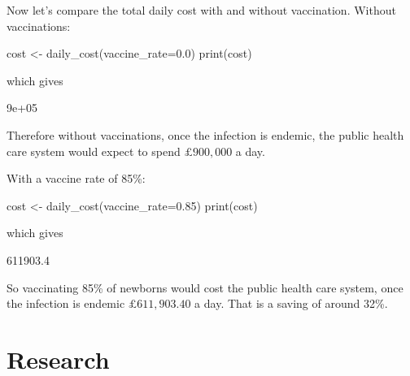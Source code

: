 Now let's compare the total daily cost with and without vaccination. Without
vaccinations:

\begin{Rin}
cost <- daily_cost(vaccine_rate=0.0)
print(cost)
\end{Rin}

which gives

\begin{Rout}
[1] 9e+05
\end{Rout}

Therefore without vaccinations, once the infection is endemic, the public health
care system would expect to spend $\pounds 900,000$ a day.

With a vaccine rate of 85\%:

\begin{Rin}
cost <- daily_cost(vaccine_rate=0.85)
print(cost)
\end{Rin}

which gives

\begin{Rout}
[1] 611903.4
\end{Rout}

So vaccinating 85\% of newborns would cost the public health care system, once
the infection is endemic $\pounds 611,903.40$ a day. That is a saving of around
32\%.



\section{Research}\label{sec:research}
